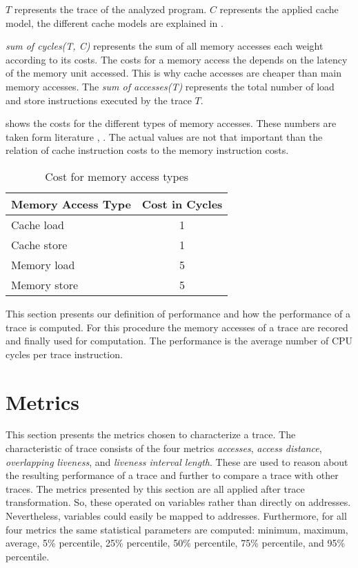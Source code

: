 \documentclass[onecolumn, openright, master, english, signatures]{dbrgrptt}
\begin{document}
$T$ represents the \ac{trace} of the analyzed program. $C$ represents the applied cache model, the different cache models are explained in .

\emph{sum of cycles(T, C)} represents the sum of all memory accesses each weight according to its costs. The costs for a memory access the depends on the latency of the memory unit accessed. This is why cache accesses are cheaper than main memory accesses. The \emph{sum of accesses(T)} represents the total number of load and store instructions executed by the \ac{trace} $T$.

 shows the costs for the different types of memory accesses. These numbers are taken form literature \cite{drepper2007every}, \cite{skylake}. The actual values are not that important than the relation of cache instruction costs to the memory instruction costs.

\begin{table}[!ht]
  \centering
  \begin{tabular}{lc}
  \hline
  Memory Access Type & Cost in Cycles \\
  \hline
  Cache  load  & 1 \\
  Cache  store & 1 \\
  Memory load  & 5 \\
  Memory store & 5 \\
  \hline
  \end{tabular}
  \caption{Cost for memory access types}
  \label{tab:memory-access-cost}
\end{table}

This section presents our definition of performance and how the performance of a trace is computed. For this procedure the memory accesses of a  \ac{trace} are recored and finally used for computation. The performance is the average number of \ac{CPU} cycles per \ac{trace} instruction.


\section{Metrics}\label{sec:metrics}

This section presents the metrics chosen to characterize a \ac{trace}. The characteristic of \ac{trace} consists of the four metrics \emph{accesses}, \emph{access distance}, \emph{overlapping liveness}, and \emph{liveness interval length}. These are used to reason about the resulting performance of a \ac{trace} and further to compare a \ac{trace} with other \ac{trace}s. The metrics presented by this section are all applied after \ac{trace} transformation. So, these operated on variables rather than directly on addresses. Nevertheless, variables could easily be mapped to addresses. Furthermore, for all four metrics the same statistical parameters are computed: minimum, maximum, average, 5\% percentile, 25\% percentile, 50\% percentile, 75\% percentile, and 95\% percentile.
\end{document}
